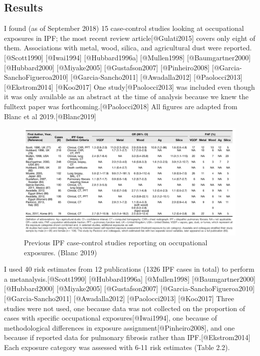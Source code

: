 \documentclass[
]{article}
\begin{document}
\hypertarget{results}{%
\subsection{Results}\label{results}}

I found (as of September 2018) 15 case-control studies looking at
occupational exposures in IPF; the most recent review
article{[}@Gulati2015{]} covers only eight of them. Associations with
metal, wood, silica, and agricultural dust were reported.
{[}@Scott1990{]} {[}@Iwai1994{]} {[}@Hubbard1996a{]} {[}@Mullen1998{]}
{[}@Baumgartner2000{]} {[}@Hubbard2000{]} {[}@Miyake2005{]}
{[}@Gustafson2007{]} {[}@Pinheiro2008{]}
{[}@Garcia-SanchoFigueroa2010{]} {[}@Garcia-Sancho2011{]}
{[}@Awadalla2012{]} {[}@Paolocci2013{]} {[}@Ekstrom2014{]}
{[}@Koo2017{]} One study{[}@Paolocci2013{]} was included even though it
was only available as an abstract at the time of analysis because we
knew the fulltext paper was forthcoming.{[}@Paolocci2018{]} All figures
are adapted from Blanc et al 2019.{[}@Blanc2019{]}

\begin{figure}
\centering
\includegraphics{source/figures/prevstudies.jpg}
\caption{Previous IPF case-control studies reporting on occupational
exposures. (Blanc 2019)}
\end{figure}

I used 40 risk estimates from 12 publications (1326 IPF cases in total)
to perform a metanalysis.{[}@Scott1990{]} {[}@Hubbard1996a{]}
{[}@Mullen1998{]} {[}@Baumgartner2000{]} {[}@Hubbard2000{]}
{[}@Miyake2005{]} {[}@Gustafson2007{]} {[}@Garcia-SanchoFigueroa2010{]}
{[}@Garcia-Sancho2011{]} {[}@Awadalla2012{]} {[}@Paolocci2013{]}
{[}@Koo2017{]} Three studies were not used, one because data was not
collected on the proportion of cases with specific occupational
exposures{[}@Iwai1994{]}, one because of methodological differences in
exposure assignment{[}@Pinheiro2008{]}, and one because if reported data
for pulmonary fibrosis rather than IPF.{[}@Ekstrom2014{]} Each exposure
category was assessed with 6-11 risk estimates (Table 2.2).
\end{document}
